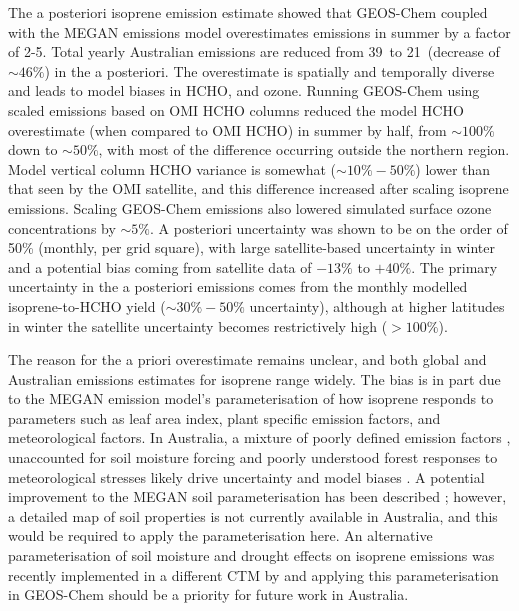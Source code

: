   The a posteriori isoprene emission estimate showed that GEOS-Chem coupled with the MEGAN emissions model overestimates emissions in summer by a factor of 2-5.
  Total yearly Australian emissions are reduced from 39\tgpyr ~to 21\tgpyr ~(decrease of $\sim{46}\%$) in the a posteriori.
  The overestimate is spatially and temporally diverse and leads to model biases in HCHO, and ozone.
  Running GEOS-Chem using scaled emissions based on OMI HCHO columns reduced the model HCHO overestimate (when compared to OMI HCHO) in summer by half, from $\sim{100\%}$ down to $\sim{50\%}$, with most of the difference occurring outside the northern region.
  Model vertical column HCHO variance is somewhat ($\sim{10\%-50\%}$) lower than that seen by the OMI satellite, and this difference increased after scaling isoprene emissions.
  Scaling GEOS-Chem emissions also lowered simulated surface ozone concentrations by $\sim 5\%$.
  A posteriori uncertainty was shown to be on the order of 50\%  (monthly, per grid square), with large satellite-based uncertainty in winter and a potential bias coming from satellite data of $-13\%$ to $+40\%$.
  The primary uncertainty in the a posteriori emissions comes from the monthly modelled isoprene-to-HCHO yield ($\sim 30\%-50\%$ uncertainty), although at higher latitudes in winter the satellite uncertainty becomes restrictively high ($>100\%$).
  
  
  The reason for the a priori overestimate remains unclear, and both global and Australian emissions estimates for isoprene range widely.
  The bias is in part due to the MEGAN emission model's parameterisation of how isoprene responds to parameters such as leaf area index, plant specific emission factors, and meteorological factors. 
  In Australia, a mixture of poorly defined emission factors \parencite[e.g.,][]{Emmerson2016}, unaccounted for soil moisture forcing \parencite[e.g.,][]{Sindelarova2014, Emmerson2019} and poorly understood forest responses to meteorological stresses likely drive uncertainty and model biases \parencite{Jiang2018,Emmerson2019}.
  A potential improvement to the MEGAN soil parameterisation has been described \parencite{Jiang2018}; however, a detailed map of soil properties is not currently available in Australia, and this would be required to apply the parameterisation here.
  An alternative parameterisation of soil moisture and drought effects on isoprene emissions was recently implemented in a different CTM by \textcite{Emmerson2019} and applying this parameterisation in GEOS-Chem should be a priority for future work in Australia.  



